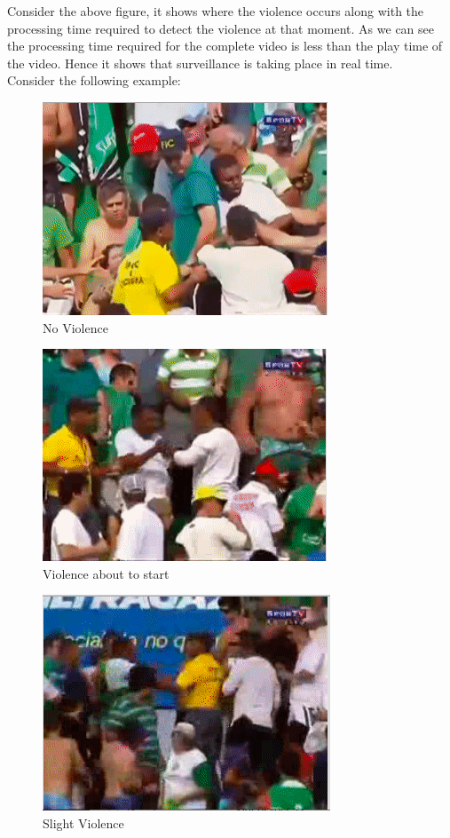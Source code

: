 Consider the above figure, it shows where the violence occurs along with the processing time required to detect the violence at that moment. As we can see the processing time required for the complete video is less than the play time of the video. Hence it shows that surveillance is taking place in real time.\\
Consider the following example:
\begin{figure}[H]
\centering
\includegraphics[scale = 0.5]{scene1.png}
\caption{No Violence}
\end{figure}
\begin{figure}[H]
\centering
\includegraphics[scale = 0.5]{scene3.png}
\caption{Violence about to start}
\end{figure}
\begin{figure}[H]
\centering
\includegraphics[scale = 0.5]{scene4.png}
\caption{Slight Violence}
\end{figure}
